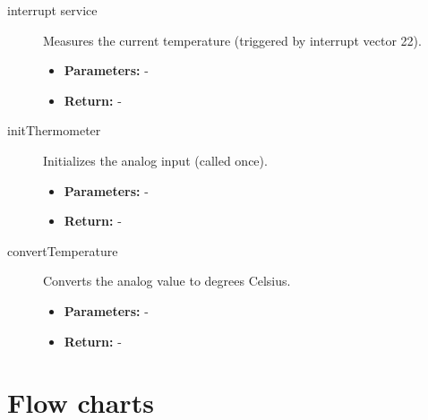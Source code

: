 \documentclass[a4paper,12pt]{article}
\begin{document}
\begin{description}
    \item[interrupt service] Measures the current temperature (triggered by interrupt vector 22).
    \begin{itemize}
        \item \textbf{Parameters:} -
        \item \textbf{Return:} -
    \end{itemize}
    
    \item[initThermometer] Initializes the analog input (called once).
    \begin{itemize}
        \item \textbf{Parameters:} -
        \item \textbf{Return:} -
    \end{itemize}
    
    \item[convertTemperature] Converts the analog value to degrees Celsius.
    \begin{itemize}
        \item \textbf{Parameters:} -
        \item \textbf{Return:} -
    \end{itemize}
\end{description}
\newpage
\section{Flow charts}
\end{document}
